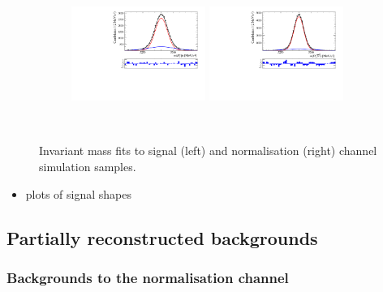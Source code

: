 \begin{figure}[!h]
\begin{subfigure}[t]{1.0\textwidth}
        \caption{\decay{\Dsp}{\Kp\pim\pip}}
    \end{subfigure}\\
    \begin{subfigure}[t]{1.0\textwidth}
        \includegraphics[width=0.48\textwidth]{figs/B2DsPhi/Plot_signal_Fit_All_B2PhiDs_Ds2PiPiPi.pdf}
        \includegraphics[width=0.48\textwidth]{figs/B2DsPhi/Plot_signal_Fit_All_B2D0Ds_Ds2PiPiPi.pdf}
        \caption{\decay{\Dsp}{\pip\pim\pip}}
    \end{subfigure}\\
    \caption{Invariant mass fits to signal (left) and normalisation (right) channel simulation samples.}
    \label{fig:B2DsPhi_signal_fits}   
\end{figure}


{\color{Red}
\begin{itemize}
\item plots of signal shapes
\end{itemize}
}



\subsection{Partially reconstructed backgrounds}
\label{sec:B2DsPhi_partrecocomps}

\subsubsection{Backgrounds to the normalisation channel}

